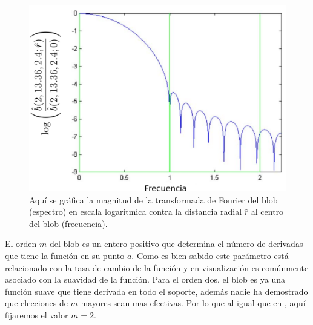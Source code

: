 \begin{figure}[htp]
 \centering
  \includegraphics[scale=0.9]{img/cap02/blobSpectre}
  \caption[Espectro del blob en escala logarítmica]{Aquí se gráfica la magnitud de la transformada de Fourier del blob (espectro) en escala logarítmica contra la distancia radial $\hat{r}$ al centro del blob (frecuencia).}
  \label{fig:blobSpectre}
\end{figure}



El orden $m$ del blob es un entero positivo que determina el número de derivadas que tiene la función en su punto $a$. Como es bien sabido este parámetro está relacionado con la tasa de cambio de la función y en visualización es comúnmente asociado con la suavidad de la función. Para el orden dos, el blob es ya una función suave que tiene derivada en todo el soporte, además nadie ha demostrado que elecciones de $m$ mayores sean mas efectivas. Por lo que al igual que en \cite{EdgarOptimization}, aquí fijaremos el valor $m = 2$. 

